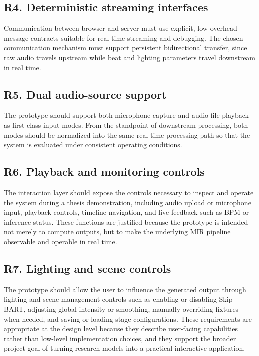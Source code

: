 \subsection{R4. Deterministic streaming interfaces}

Communication between browser and server must use explicit, low-overhead message contracts suitable for real-time streaming and debugging. The chosen communication mechanism must support persistent bidirectional transfer, since raw audio travels upstream while beat and lighting parameters travel downstream in real time.

\subsection{R5. Dual audio-source support}

The prototype should support both microphone capture and audio-file playback as first-class input modes. From the standpoint of downstream processing, both modes should be normalized into the same real-time processing path so that the system is evaluated under consistent operating conditions.

\subsection{R6. Playback and monitoring controls}

The interaction layer should expose the controls necessary to inspect and operate the system during a thesis demonstration, including audio upload or microphone input, playback controls, timeline navigation, and live feedback such as BPM or inference status. These functions are justified because the prototype is intended not merely to compute outputs, but to make the underlying MIR pipeline observable and operable in real time.

\subsection{R7. Lighting and scene controls}

The prototype should allow the user to influence the generated output through lighting and scene-management controls such as enabling or disabling Skip-BART, adjusting global intensity or smoothing, manually overriding fixtures when needed, and saving or loading stage configurations. These requirements are appropriate at the design level because they describe user-facing capabilities rather than low-level implementation choices, and they support the broader project goal of turning research models into a practical interactive application.

